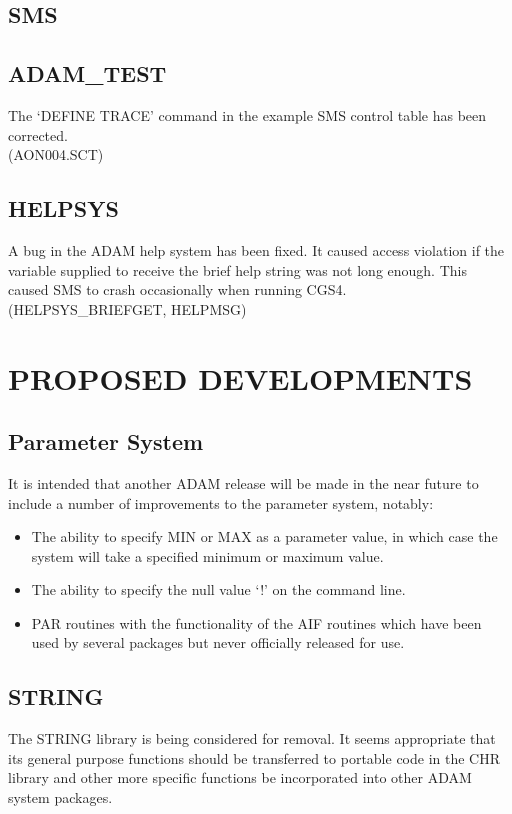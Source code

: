 \subsection{SMS}

\subsection{ADAM\_TEST}
The `DEFINE TRACE' command in the example SMS control table has been
corrected.\\
(AON004.SCT)

\subsection{HELPSYS}
A bug in the ADAM help system has been fixed. It caused access violation if
the variable supplied to receive the brief help string was not long enough.
This caused SMS to crash occasionally when running CGS4.\\
(HELPSYS\_BRIEFGET, HELPMSG)

\section{PROPOSED DEVELOPMENTS}
\subsection{Parameter System}
It is intended that another ADAM release will be made in the near future to
include a number of improvements to the parameter system, notably:
\begin{itemize}
\item The ability to specify MIN or MAX as a parameter value, in which case
the system will take a specified minimum or maximum value.
\item The ability to specify the null value `!' on the command line.
\item PAR routines with the functionality of the AIF routines which have been
used by several packages but never officially released for use.
\end{itemize}

\subsection{STRING}
The STRING library is being considered for removal. It seems appropriate that
its general purpose functions should be transferred to portable code in the
CHR library and other more specific functions be incorporated into other
ADAM system packages.


